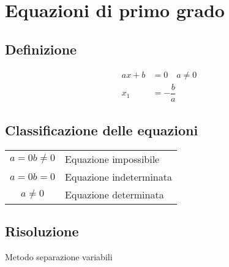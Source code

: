 \chapter{Equazioni di primo grado}
\section{Definizione}
\begin{align}
ax+b&={}0\quad a\neq 0\\
x_1&=-\dfrac{b}{a}
\end{align}
\section{Classificazione delle equazioni}
\begin{center}
	\begin{tabular}{cl}
		\toprule
		$a=0$\quad $b\neq 0$	& Equazione impossibile  \\ 
		$a=0$\quad $b=0$	& Equazione indeterminata\\ 
		$a\neq0$	& Equazione determinata  \\ 
		\bottomrule
	\end{tabular} 
\end{center}
\section{Risoluzione}
Metodo separazione variabili